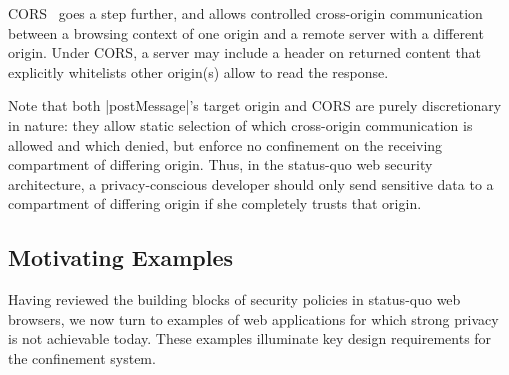 
CORS~\cite{cors13} goes a step further, and allows controlled
cross-origin communication between a browsing context of one origin
and a remote server with a different origin. Under CORS, a server may
include a header on returned content that explicitly whitelists other
origin(s) allow to read the response.

%
 
Note that both \js|postMessage|'s target origin and CORS are purely
discretionary in nature: they allow static selection of which
cross-origin communication is allowed and which denied, but enforce no
confinement on the receiving compartment of differing origin. Thus, in
the status-quo web security architecture, a privacy-conscious
developer should only send sensitive data to a compartment of
differing origin if she completely trusts that origin. 

%

\subsection{Motivating Examples}
\label{sec:motivating-examples}

Having reviewed the building blocks of security policies in status-quo
web browsers, we now turn to examples of web applications for which
strong privacy is not achievable today. %
These examples
illuminate key design requirements for the \sys{} confinement
system. %

